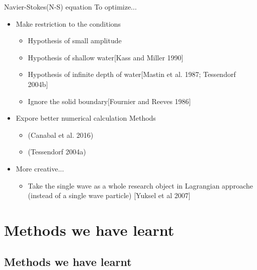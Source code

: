 \documentclass{beamer}
\begin{document}
\begin{frame}{Navier-Stokes(N-S) equation}
  To optimize...
  \begin{itemize}
    \item Make restriction to the conditions
      \begin{itemize}
        \item Hypothesis of small amplitude
        \item Hypothesis of shallow water[Kass and Miller 1990]
        \item Hypothesis of infinite depth of water[Mastin et al. 1987; Tessendorf 2004b]
        \item Ignore the solid boundary[Fournier and Reeves 1986]
      \end{itemize}
    \item Expore better numerical calculation Methods
      \begin{itemize}
        \item (Canabal et al. 2016)
        \item (Tessendorf 2004a)
      \end{itemize}
    \item More creative...
      \begin{itemize}
        \item Take the single wave as a whole research object in Lagrangian approache \textcolor[rgb]{0.7,0.7,0.5}{(instead of a single wave particle)} [Yuksel et al 2007]
      \end{itemize}
  \end{itemize}
\end{frame}
\section{Methods we have learnt}
\subsection{Methods we have learnt}
\end{document}
